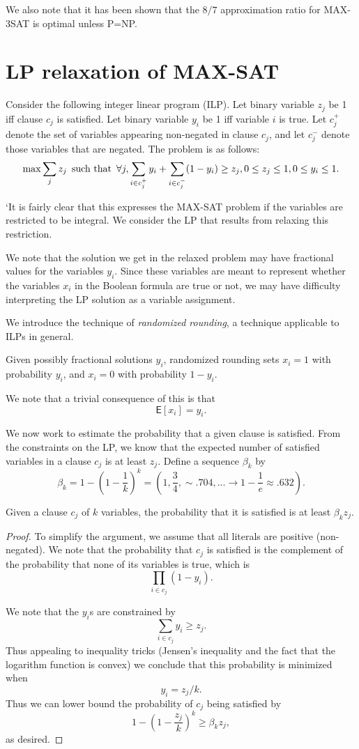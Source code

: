 \documentclass{article}
\newcommand{\E}{\mbox{$\mathsf E$}}
\begin{document}
We also note that it has been shown that the $8/7$ approximation ratio for MAX-3SAT is optimal unless P=NP.

\section{LP relaxation of MAX-SAT}

Consider the following integer linear program (ILP).  Let binary variable $z_j$ be 1 iff clause $c_j$ is satisfied.  Let binary variable $y_i$ be 1 iff variable $i$ is true.  Let $c_j^+$ denote the set of variables appearing non-negated in clause $c_j$, and let $c_j^-$ denote those variables that are negated.  The problem is as follows:
$$\max\sum_j z_j \textrm{\enspace such that\enspace} \forall j, \sum_{i\in c_j^+}y_i+\sum_{i\in c_j^-}(1-y_i)\geq z_j, 0\leq z_j\leq 1, 0\leq y_i\leq 1.$$

`It is fairly clear that this expresses the MAX-SAT problem if the variables are restricted to be integral.  We consider the LP that results from relaxing this restriction.

We note that the solution we get in the relaxed problem may have fractional values for the variables $y_i$.  Since these variables are meant to represent whether the variables $x_i$ in the Boolean formula are true or not, we may have difficulty interpreting the LP solution as a variable assignment.

We introduce the technique of \emph{randomized rounding}, a technique applicable to ILPs in general.

Given possibly fractional solutions $y_i$, randomized rounding sets $x_i=1$ with probability $y_i$, and $x_i=0$ with probability $1-y_i$.

We note that a trivial consequence of this is that $$\E[x_i]=y_i.$$

We now work to estimate the probability that a given clause is satisfied.  From the constraints on the LP, we know that the expected number of satisfied variables in a clause $c_j$ is at least $z_j$.  Define a sequence $\beta_k$ by $$\beta_k=1-(1-\frac{1}{k})^k=(1,\frac{3}{4},\sim .704,...\rightarrow 1-\frac{1}{e}\approx .632).$$

\begin{claim}
Given a clause $c_j$ of $k$ variables, the probability that it is satisfied is at least $\beta_kz_j$.
\end{claim}

\begin{proof}
To simplify the argument, we assume that all literals are positive (non-negated).  We note that the probability that $c_j$ is satisfied is the complement of the probability that none of its variables is true, which is $$\prod_{i\in c_j}(1-y_i).$$

We note that the $y_i$s are constrained by $$\sum_{i\in c_j} y_i\geq z_j.$$  Thus appealing to inequality tricks (Jensen's inequality and the fact that the logarithm function is convex) we conclude that this probability is minimized when $$y_i=z_j/k.$$
Thus we can lower bound the probability of $c_j$ being satisfied by $$1-(1-\frac{z_j}{k})^k\geq\beta_kz_j,$$ as desired.
\end{proof}
\end{document}
